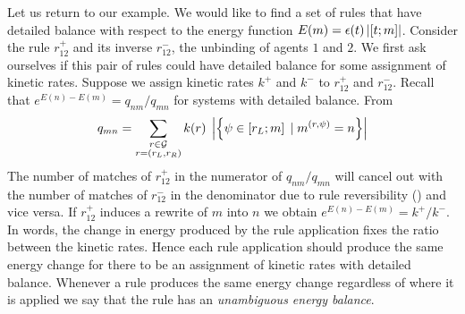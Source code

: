 Let us return to our example.
We would like to find a set of rules that have detailed balance
with respect to the energy function
$E(m) = \epsilon(t) \left\lvert \left[t;m\right] \right\rvert$.
Consider the rule $r^+_{12}$ and its inverse $r^-_{12}$,
the unbinding of agents $1$ and $2$.
We first ask ourselves if this pair of rules
could have detailed balance
for some assignment of kinetic rates.
Suppose we assign kinetic rates $k^+$ and $k^-$
to $r^+_{12}$ and $r^-_{12}$.
Recall that $e^{E(n)-E(m)} = q_{nm}/q_{mn}$
for systems with detailed balance. %
From 
\[ q_{mn} = \sum_{\substack{r \in \mathcal{G}\\r = \left(r_L,r_R\right)}}
   k(r) \; \left\lvert \left\{ \psi \in \left[r_L;m\right] \; | \; m^{(r,\psi)} = n \right\} \right\rvert
\]
The number of matches of $r^+_{12}$
in the numerator of $q_{nm}/q_{mn}$ will cancel out
with the number of matches of $r^-_{12}$ in the denominator
due to rule reversibility () and vice versa.
If $r^+_{12}$ induces a rewrite of $m$ into $n$ we obtain
$e^{E(n)-E(m)} = k^+/k^-$.
In words, the change in energy produced by the rule application
fixes the ratio between the kinetic rates.
Hence each rule application should produce the same energy change
for there to be an assignment of kinetic rates with detailed balance.
Whenever a rule produces the same energy change
regardless of where it is applied
we say that the rule has an \emph{unambiguous energy balance}.









